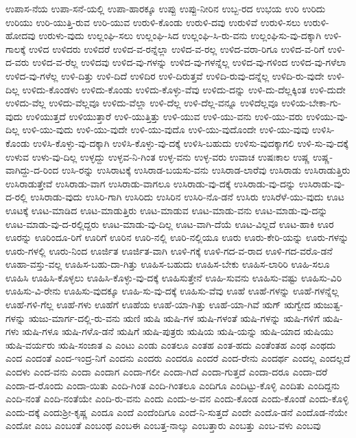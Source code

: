 {ಉಪಾಸ-ನೆಯ
ಉಪಾ-ಸನೆ-ಯಲ್ಲಿ
ಉಪಾ-ಹಾರಕ್ಕೂ
ಉಪ್ಪು
ಉಪ್ಪು-ನೀರಿನ
ಉಬ್ಬ-ರದ
ಉಭಯ
ಉರಿ
ಉರಿದು
ಉರಿಯು
ಉರಿ-ಯುತ್ತಿ-ರುವ
ಉರಿ-ಯುವ
ಉರುಳಿ-ಕೊಂಡು
ಉರುಳಿ-ದವು
ಉರುಳಿವೆ
ಉರುಳಿ-ಸಲು
ಉರುಳಿ-ಹೋದವು
ಉರುಳು-ವುದು
ಉಲ್ಲಂಘಿ-ಸಲು
ಉಲ್ಲಂಘಿ-ಸಿದ
ಉಲ್ಲಂಘಿ-ಸಿ-ರು-ವನು
ಉಲ್ಲಂಘಿಸು-ವು-ದಕ್ಕಾಗಿ
ಉಳಿ-ಗಾಲಕ್ಕೆ
ಉಳಿದ
ಉಳಿದರು
ಉಳಿದರೆ
ಉಳಿದ-ವ-ರನ್ನೆಲ್ಲಾ
ಉಳಿದ-ವ-ರಲ್ಲ
ಉಳಿದ-ವರಾ-ರಿಗೂ
ಉಳಿದ-ವ-ರಿಗೆ
ಉಳಿ-ದ-ವರು
ಉಳಿದ-ವ-ರೆಲ್ಲ
ಉಳಿದವು
ಉಳಿದ-ವು-ಗಳನ್ನು
ಉಳಿದ-ವು-ಗಳನ್ನೆಲ್ಲ
ಉಳಿದ-ವು-ಗಳಿಂದ
ಉಳಿದ-ವು-ಗಳೆಲಾ
ಉಳಿದ-ವು-ಗಳೆಲ್ಲ
ಉಳಿ-ದಿತ್ತು
ಉಳಿ-ದಿದೆ
ಉಳಿದಿರ
ಉಳಿ-ದಿರುತ್ತವೆ
ಉಳಿದಿ-ರುವು-ದನ್ನೆಲ್ಲ
ಉಳಿದಿ-ರು-ವುದೇ
ಉಳಿ-ದಿಲ್ಲ
ಉಳಿದು-ಕೊಂಡಳು
ಉಳಿದು-ಕೊಂಡು
ಉಳಿದು-ಕೊಳ್ಳು-ವೆವು
ಉಳಿದು-ದನ್ನು
ಉಳಿ-ದು-ದೆಲ್ಲಕ್ಕಿಂತ
ಉಳಿ-ದುದೇ
ಉಳಿದು-ವೆಲ್ಲ
ಉಳಿದು-ವೆಲ್ಲವೂ
ಉಳಿದು-ವೆಲ್ಲಾ
ಉಳಿ-ದೆಲ್ಲ
ಉಳಿ-ದೆಲ್ಲ-ವನ್ನೂ
ಉಳಿದೆಲ್ಲವೂ
ಉಳಿಯ-ಬೇಕಾ-ಗು-ವುದು
ಉಳಿಯುತ್ತದೆ
ಉಳಿಯುತ್ತಾರೆ
ಉಳಿ-ಯುತ್ತಿತ್ತು
ಉಳಿ-ಯುವ
ಉಳಿ-ಯು-ವನು
ಉಳಿ-ಯು-ವರು
ಉಳಿಯು-ವು-ದಿಲ್ಲ
ಉಳಿ-ಯು-ವುದು
ಉಳಿ-ಯು-ವುದೇ
ಉಳಿ-ಯು-ವುದೊ
ಉಳಿ-ಯು-ವುದೊಂದೇ
ಉಳಿ-ಯು-ವುವು
ಉಳಿಸಿ-ಕೊಂಡು
ಉಳಿಸಿ-ಕೊಳ್ಳು-ವು-ದಕ್ಕಾಗಿ
ಉಳಿಸಿ-ಕೊಳ್ಳು-ವು-ದಕ್ಕೆ
ಉಳಿಸಿ-ಬಹುದು
ಉಳಿಸು-ವುದಕ್ಕಾಗಲಿ
ಉಳಿ-ಸು-ವು-ದಕ್ಕೆ
ಉಳುವ
ಉಳು-ವು-ದಿಲ್ಲ
ಉಳ್ಳದ್ದು
ಉಳ್ಳವ-ನಿ-ಗಿಂತ
ಉಳ್ಳ-ವನು
ಉಳ್ಳ-ವರು
ಉವಾಚ
ಉಷಃಕಾಲ
ಉಷ್ಣ
ಉಷ್ಣ-ವಾಗಿದ್ದು-ದ-ರಿಂದ
ಉಸಿ-ರನ್ನು
ಉಸಿರಾಟಕ್ಕೆ
ಉಸಿರಾಡ-ಬಯಸು-ವನು
ಉಸಿರಾಡ-ಲಾರೆವು
ಉಸಿರಾಡು
ಉಸಿರಾಡುತ್ತಿರು
ಉಸಿರಾಡುತ್ತೇವೆ
ಉಸಿರಾಡು-ವಾಗ
ಉಸಿರಾಡು-ವಾಗಲೂ
ಉಸಿರಾಡು-ವು-ದಕ್ಕೆ
ಉಸಿರಾಡು-ವು-ದನ್ನು
ಉಸಿರಾಡು-ವು-ದ-ರಲ್ಲಿ
ಉಸಿರಾಡು-ವುದು
ಉಸಿರಿ-ಗಾಗಿ
ಉಸಿರಿದು
ಉಸಿರಿನ
ಉಸಿರಿ-ನೊ-ಡನೆ
ಉಸಿರು
ಉಸಿರೆಳೆ-ಯು-ವುದು
ಊಟ
ಊಟಕ್ಕೆ
ಊಟ-ಮಾಡಿದ
ಊಟ-ಮಾಡುತ್ತಿರು
ಊಟ-ಮಾಡುವ
ಊಟ-ಮಾಡು-ವನು
ಊಟ-ಮಾಡು-ವು-ದನ್ನು
ಊಟ-ಮಾಡು-ವು-ದ-ರಲ್ಲಿದ್ದರು
ಊಟ-ಮಾಡು-ವು-ದಿಲ್ಲ
ಊಟ-ವಾಗಿ-ದೆಯೆ
ಊಟ-ವಿಲ್ಲದೆ
ಊಟ-ಹಾಕಿ
ಊರ
ಊರನ್ನು
ಊರಿಂದೂ-ರಿಗೆ
ಊರಿಗೆ
ಊರಿನ
ಊರಿ-ನಲ್ಲಿ
ಊರಿ-ನಲ್ಲಿಯೂ
ಊರು
ಊರು-ಕೇರಿ-ಯನ್ನು
ಊರು-ಗಳನ್ನು
ಊರು-ಗಳಲ್ಲಿ
ಊರು-ನಿಂದ
ಊರ್ಜಿತ
ಊರ್ಜಿತ-ವಾಗಿ
ಊಳಿ-ಗಕ್ಕೆ
ಊಳಿ-ಗದ-ವ-ರಾದ
ಊಳಿ-ಗದ-ವರೊ-ಡನೆ
ಊಹಾ-ವಸ್ತು-ವಲ್ಲ
ಊಹಿಸ-ಬಹು-ದಾ-ಗಿತ್ತು
ಊಹಿಸ-ಬಹುದು
ಊಹಿಸ-ಬೇಕು
ಊಹಿಸ-ಲಾರಿರಿ
ಊಹಿ-ಸಲೂ
ಊಹಿಸಿ
ಊಹಿಸಿ-ಕೊಳ್ಳಲು
ಊಹಿಸಿ-ಕೊಳ್ಳು-ವು-ದಕ್ಕೆ
ಊಹಿಸುತ್ತೇನೆ
ಊಹಿ-ಸುವನು
ಊಹಿಸು-ವಷ್ಟು
ಊಹಿಸು-ವಿರಿ
ಊಹಿಸು-ವಿ-ರೇನು
ಊಹಿಸು-ವುದಕ್ಕೂ
ಊಹಿ-ಸು-ವು-ದಕ್ಕೆ
ಊಹಿಸು-ವೆವು
ಊಹೆ
ಊಹೆ-ಗಳನ್ನು
ಊಹೆ-ಗಳನ್ನೆಲ್ಲ
ಊಹೆ-ಗಳಿ-ಗೆಲ್ಲ
ಊಹೆ-ಗಳು
ಊಹೆಗೆ
ಊಹೆಯ
ಊಹೆ-ಯಾ-ಗಿತ್ತು
ಊಹೆ-ಯಾ-ಗಿವೆ
ಋಗ್
ಋಗ್ವೇದ
ಋಜುತ್ವ-ಗಳನ್ನು
ಋಜು-ಮಾರ್ಗ-ದಲ್ಲಿ-ರು-ವನು
ಋಣಿ
ಋಷಿ
ಋಷಿ-ಗಳ
ಋಷಿ-ಗಳಂತೆ
ಋಷಿ-ಗಳನ್ನು
ಋಷಿ-ಗಳಿಗೆ
ಋಷಿ-ಗಳು
ಋಷಿ-ಗಳೂ
ಋಷಿ-ಗಳೊ-ಡನೆ
ಋಷಿಗೆ
ಋಷಿ-ಪುತ್ರರು
ಋಷಿಯ
ಋಷಿ-ಯನ್ನು
ಋಷಿ-ಯಾದ
ಋಷಿಯು
ಋಷಿ-ವರ್ಯರು
ಋಷಿ-ಸಂಜಾತ
ಎ
ಎಂಟು
ಎಂಡು
ಎಂತಲೂ
ಎಂತಹ
ಎಂತ-ಹದು
ಎಂತೆಂತಹ
ಎಂಥ
ಎಂಥದು
ಎಂದ
ಎಂದಂತೆ
ಎಂದ-ಇಂದ್ರ-ನಿಗೆ
ಎಂದನು
ಎಂದರು
ಎಂದರೂ
ಎಂದರೆ
ಎಂದ-ರೇನು
ಎಂದರ್ಥ
ಎಂದಲ್ಲ
ಎಂದಲ್ಲದೆ
ಎಂದಳು
ಎಂದ-ವನು
ಎಂದಾ
ಎಂದಾಗ
ಎಂದಾ-ಗಲೀ
ಎಂದಾ-ಗಿದೆ
ಎಂದಾ-ಗುತ್ತದೆ
ಎಂದಾ-ದರೂ
ಎಂದಾ-ದರೆ
ಎಂದಾ-ದ-ರೊಂದು
ಎಂದಾ-ಯಿತು
ಎಂದಿ-ಗಿಂತ
ಎಂದಿ-ಗಿಂತಲೂ
ಎಂದಿಗೂ
ಎಂದಿಟ್ಟು-ಕೊಳ್ಳಿ
ಎಂದಿತು
ಎಂದಿದ್ದನು
ಎಂದಿ-ನಂತೆ
ಎಂದಿ-ನಂತೆಯೇ
ಎಂದಿ-ರು-ವನು
ಎಂದು
ಎಂದು-ಅ-ವನ
ಎಂದು-ಕೊಂಡ
ಎಂದು-ಕೊಂಡೆ
ಎಂದು-ಕೊಳ್ಳಿ
ಎಂದು-ದಕ್ಕೆ
ಎಂದುಶ್ರೀ-ಕೃಷ್ಣ
ಎಂದೂ
ಎಂದೆ
ಎಂದೆಂದಿಗೂ
ಎಂದೆ-ನಿ-ಸುತ್ತದೆ
ಎಂದೇ
ಎಂದೊ-ಡನೆ
ಎಂದೊಡ-ನೆಯೇ
ಎಂದೋ
ಎಂಬ
ಎಂಬಂತೆ
ಎಂಬಂಥ
ಎಂಬಈ
ಎಂಬತ್ತ-ನಾಲ್ಕು
ಎಂಬತ್ತಾರು
ಎಂಬತ್ತು
ಎಂಬ-ವಳು
ಎಂಬವು
}
